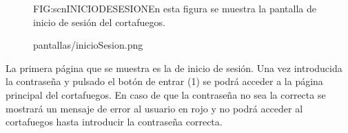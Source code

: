\begin{figure}[Pantalla de inicio de sesión]{FIG:scnINICIODESESION}{En esta figura se muestra la pantalla de inicio de sesión del cortafuegos.}
  \begin{image}{}{}{pantallas/inicioSesion.png}
  \end{image}
\end{figure}

La primera página que se muestra es la de inicio de sesión. Una vez introducida la contraseña y pulsado el botón de entrar (1) se podrá acceder a la página principal del cortafuegos. En caso de que la contraseña no sea la correcta se mostrará un mensaje de error al usuario en rojo y no podrá acceder al cortafuegos hasta introducir la contraseña correcta.
